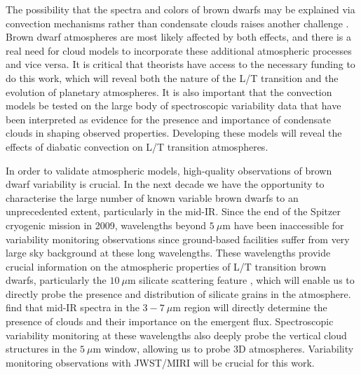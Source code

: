 \documentclass[12pt]{article}
\begin{document}
\begin{justify}
\noindent 
The possibility that the spectra and colors of brown dwarfs may be explained via convection mechanisms rather than condensate clouds raises another challenge \citep{Tremblin2015, Tremblin2016, Tremblin2017}. 
Brown dwarf atmospheres are most likely affected by both effects, and there is a real need for cloud models to incorporate these additional atmospheric processes and vice versa.  It is critical that theorists have access to the necessary funding to do this work, which will reveal both the nature of the L/T transition and the evolution of planetary atmospheres. It is also important that the convection models be tested on the large body of spectroscopic variability data \citep{Apai2013,Buenzli2015} that have been interpreted as evidence for the presence and importance of condensate clouds in shaping observed properties. Developing these models will reveal the effects of diabatic convection on L/T transition atmospheres. \smallskip
 
\noindent In order to validate atmospheric models, high-quality observations of brown dwarf variability is crucial.
 In the next decade we have the opportunity to characterise the large number of known variable brown dwarfs \citep[e.g.][]{Artigau2009,Gillon2013,Radigan2014, Metchev2015a} to an unprecedented extent, particularly in the mid-IR. 
 Since the end of the Spitzer cryogenic mission in 2009, wavelengths beyond $5~\mu $m have been inaccessible for variability monitoring observations since ground-based facilities suffer from very large sky background at these long wavelengths. These wavelengths provide crucial information on the atmospheric properties of L/T transition brown dwarfs, particularly the $10~\mu $m silicate scattering feature \citep{Cushing2006}, which will enable us to directly probe the presence and distribution of silicate grains in the atmosphere. \citep{Tremblin2017} find that mid-IR spectra in the $3-7~\mu $m region will directly determine the presence of clouds and their importance on the emergent flux. Spectroscopic variability monitoring at these wavelengths also deeply probe the vertical cloud structures in the $5~\mu$m window, allowing us to probe 3D atmospheres. Variability monitoring observations with JWST/MIRI will be crucial for this work.


\end{justify}
\end{document}
